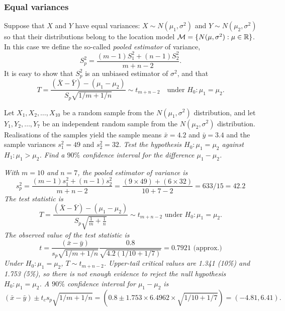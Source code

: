 

\subsubsection*{Equal variances}
Suppose that $X$ and $Y$ have equal variances: $X\sim N(\mu_1,\sigma^2)$ and $Y\sim N(\mu_2,\sigma^2)$ so that their distributions belong to the location model $\mathcal{M}=\{N(\mu,\sigma^2):\mu\in\mathbb{R}\}$. In this case we define the so-called \emph{pooled estimator} of variance,
\[
S_p^2 = \frac{(m-1)S_1^2 + (n-1)S_2^2}{m+n-2}.
\]
It is easy to show that $S_p^2$ is an unbiased estimator of $\sigma^2$, and that
\[
T = \frac{(\bar{X}-\bar{Y})-(\mu_1-\mu_2)}{S_p\sqrt{1/m+1/n}} \sim t_{m+n-2} \quad\text{under $H_0:\mu_1=\mu_2$}. 
\]

\begin{example}
Let $X_1,X_2,\ldots,X_{10}$ be a random sample from the $N(\mu_1,\sigma^2)$ distribution, and let $Y_1,Y_2,\ldots,Y_7$ be an independent random sample from the $N(\mu_2,\sigma^2)$ distribution. Realisations of the samples yield the sample means $\bar{x}=4.2$ and $\bar{y}=3.4$ and the sample variances $s_1^2=49$ and $s_2^2=32$. 
\ben
\it Test the hypothesis $H_0:\mu_1=\mu_2$ against $H_1:\mu_1>\mu_2$.
\it Find a $90\%$ confidence interval for the difference $\mu_1-\mu_2$.
\een
\begin{solution}
\ben
\it With $m=10$ and $n=7$, the pooled estimator of variance is
\[
s_p^2 = \frac{(m-1)s_1^2 + (n-1)s_2^2}{m + n - 2} = \frac{(9\times 49) + (6\times 32)}{10 + 7 - 2} = 633/15 = 42.2
\]
The test statistic is 
\[
T = \frac{(\bar{X}-\bar{Y})-(\mu_1-\mu_2)}{S_p\sqrt{\frac{1}{m}+\frac{1}{n}}} \sim t_{m+n-2}\text{ under $H_0:\mu_1=\mu_2$.}
\]
The observed value of the test statistic is
\[
t = \frac{(\bar{x}-\bar{y})}{s_p\sqrt{1/m+1/n}} \frac{0.8}{\sqrt{4.2(1/10+1/7)}} = 0.7921 \text{ (approx.)}
\]
Under $H_0:\mu_1=\mu_2$, $T\sim t_{m+n-2}$. Upper-tail critical values are 1.341 (10\%) and 1.753 (5\%), so there is not enough evidence to reject the null hypothesis $H_0:\mu_1=\mu_2$. 
\it %
A $90\%$ confidence interval for $\mu_1-\mu_2$ is
\[
(\bar{x}-\bar{y}) \pm t_c s_p\sqrt{1/m+1/n} = (0.8\pm 1.753\times 6.4962\times\sqrt{1/10+1/7}) = (-4.81, 6.41).
\]
\een
\end{solution}
\end{example}

